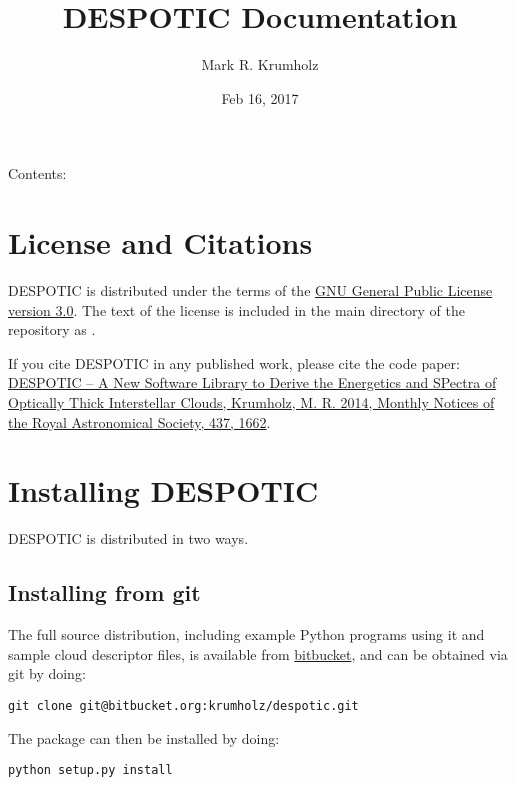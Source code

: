 \documentclass[letterpaper,10pt,english]{sphinxmanual}
\title{DESPOTIC Documentation}
\date{Feb 16, 2017}
\author{Mark R. Krumholz}
\begin{document}
\maketitle
\tableofcontents
{}\label{index::doc}


Contents:


\chapter{License and Citations}
\label{license:welcome-to-despotic-s-documentation}\label{license:license-and-citations}\label{license::doc}
DESPOTIC is distributed under the terms of the \href{http://www.gnu.org/copyleft/gpl.html}{GNU General Public License version 3.0}. The text of the license is included in the main directory of the repository as .

If you cite DESPOTIC in any published work, please cite the code paper: \href{http://adsabs.harvard.edu/abs/2014MNRAS.437.1662K}{DESPOTIC -- A New Software Library to Derive the Energetics and SPectra of Optically Thick Interstellar Clouds, Krumholz, M. R. 2014, Monthly Notices of the Royal Astronomical Society, 437, 1662}.


\chapter{Installing DESPOTIC}
\label{installation::doc}\label{installation:installing-despotic}
DESPOTIC is distributed in two ways.


\section{Installing from git}
\label{installation:installing-from-git}
The full source distribution, including example Python programs using it and sample cloud descriptor files, is available from \href{https://bitbucket.org/krumholz/despotic/}{bitbucket}, and can be obtained via git by doing:

\begin{Verbatim}[commandchars=\\\{\}]
git clone git@bitbucket.org:krumholz/despotic.git
\end{Verbatim}

The package can then be installed by doing:

\begin{Verbatim}[commandchars=\\\{\}]
python setup.py install
\end{Verbatim}
\end{document}
